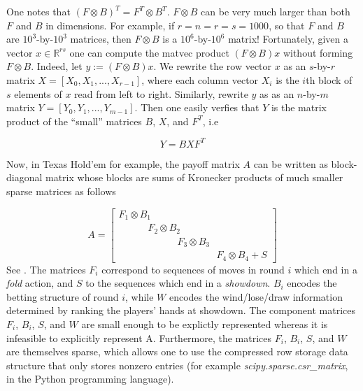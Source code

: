 \documentclass[envcountsame]{llcns2e/llncs}
\begin{document}
One notes that $(F \otimes B)^T = F^T \otimes B^T$.
$F \otimes B$ can be very much larger than both $F$ and $B$ in
dimensions. For example, if $r = n = r = s = 1000$, so that $F$ and
$B$ are $10^3$-by-$10^3$ matrices, then $F \otimes B$ is a
$10^6$-by-$10^6$ matrix! Fortunately, given a vector $x \in
\mathbb{R}^{rs}$ one can compute the matvec product $(F \otimes B)x$
without forming $F \otimes B$. Indeed, let $y := (F \otimes B)x$. We
rewrite the row vector $x$ as an $s$-by-$r$ matrix $X = [X_0, X_1,
  ..., X_{r-1}]$, where each column vector $X_i$ is the $i$th block of
$s$ elements of $x$ read from left to right. Similarly, rewrite $y$ as
as an $n$-by-$m$ matrix $Y = [Y_0, Y_1, ..., Y_{m-1}]$. Then one
easily verfies that $Y$ is the matrix product of the ``small''
matrices $B$, $X$, and $F^T$, i.e

\begin{equation}
  \label{eq:kron_matvec}
  Y = BXF^T
\end{equation}

Now, in Texas Hold'em for example, the payoff matrix $A$ can be
written as block-diagonal matrix whose blocks are sums of Kronecker
products of much smaller sparse matrices as follows

\begin{equation}
  A = \begin{bmatrix}F_1 \otimes B_1\hspace{10em}\\\hspace{3em}F_2
    \otimes B_2\hspace{7em}\\\hspace{6em}F_3 \otimes
    B_3\hspace{4em}\\\hspace{10em}F_4 \otimes B_4 + S \end{bmatrix}
\label{eq:factor_A}
\end{equation}
See \cite{hoda2010smoothing}. The matrices $F_i$ correspond to
sequences of moves in round $i$ which end in a \textit{fold} action,
and $S$ to the sequences which end in a \textit{showdown}. $B_i$
encodes the betting structure of round $i$, while $W$ encodes the
wind/lose/draw information determined by ranking the players' hands at
showdown. The component matrices $F_i$, $B_i$, $S$, and $W$ are small
enough to be explictly represented whereas it is infeasible to
explicitly represent A. Furthermore, the matrices $F_i$, $B_i$,
$S$, and $W$ are themselves sparse, which allows one to use the
compressed row storage data structure that only stores nonzero entries
(for example \textit{scipy.sparse.csr\_matrix}, in the Python
programming language).
\end{document}
